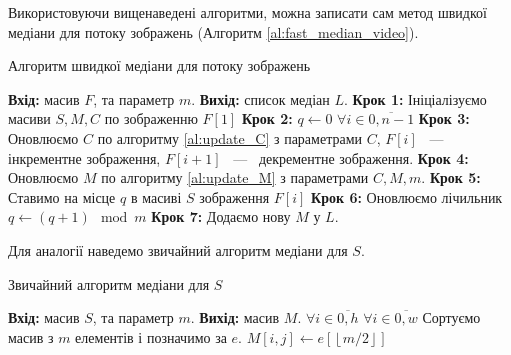 Використовуючи вищенаведені алгоритми,
можна записати сам метод швидкої медіани для потоку зображень (Алгоритм \ref{al:fast_median_video}).


\begin{algorithm}[H]
    \caption{Алгоритм швидкої медіани для потоку зображень}
    \begin{algorithmic}
        \State \textbf{Вхід:} масив $F$, та параметр $m$.
        \State \textbf{Вихід:} список медіан $L$.
        \State \textbf{Крок 1:} Ініціалізуємо масиви $S, M, C$ по зображенню $F[1]$
        \State \textbf{Крок 2:} $q \gets 0$ 
        \State  $\forall i \in \overline{0,n-1}$
        \State \qquad \textbf{Крок 3:} Оновлюємо $C$ по алгоритму \ref{al:update_C} з параметрами $C$,
        $F[i]$ ~---~ інкрементне зображення, $F[i+1]$ ~---~ декрементне зображення.
        \State \qquad \textbf{Крок 4:} Оновлюємо $M$ по алгоритму \ref{al:update_M} з параметрами $C, M, m$.
        \State \qquad \textbf{Крок 5:} Ставимо на місце $q$ в масиві $S$ зображення $F[i]$
        \State \qquad \textbf{Крок 6:} Оновлюємо лічильник $q \gets (q+1) \mod m$
        \State \qquad \textbf{Крок 7:} Додаємо нову $M$ у $L$.
    \end{algorithmic}
    \label{al:fast_median_video}
\end{algorithm}

Для аналогії наведемо звичайний алгоритм медіани для $S$.
\begin{algorithm}[H]
    \caption{Звичайний алгоритм медіани для $S$}
    \begin{algorithmic}
        \State \textbf{Вхід:} масив $S$, та параметр $m$.
        \State \textbf{Вихід:} масив $M$.
        \State  $\forall i \in \overline{0,h}$
        \State \qquad  $\forall i \in \overline{0,w}$
        \State \qquad \qquad  Сортуємо масив з $m$ елементів і позначимо за $e$.
        \State \qquad \qquad  $M[i,j] \gets e[\left\lfloor m/2 \right\rfloor ]$ 
    \end{algorithmic}
\end{algorithm}


